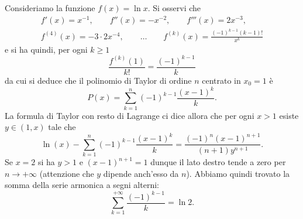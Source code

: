 \begin{example}
Consideriamo la funzione $f(x) = \ln x$.
Si osservi che
\begin{gather*}
  f'(x) = x^{-1},\qquad
  f''(x) = -x^{-2},\qquad
  f'''(x) = 2x^{-3}, \\
  f^{(4)}(x) = -3\cdot 2 x^{-4}, \qquad
  \dots \qquad
  f^{(k)}(x) = \frac{(-1)^{k-1}(k-1)!}{x^k}
\end{gather*}
e si ha quindi, per ogni $k\ge 1$
\[
  \frac{f^{(k)}(1)}{k!} = \frac{(-1)^{k-1}}{k}
\]
da cui si deduce che il polinomio di Taylor di ordine $n$
centrato in $x_0=1$ è
\[
P(x) = \sum_{k=1}^n (-1)^{k-1}\frac{(x-1)^k}{k}.
\]
La formula di Taylor con resto di Lagrange ci dice allora che per
ogni $x>1$ esiste $y\in(1,x)$ tale che
\[
  \ln(x) - \sum_{k=1}^n (-1)^{k-1}\frac{(x-1)^k}{k} = \frac{(-1)^n(x-1)^{n+1}}{(n+1)y^{n+1}}.
\]
Se $x=2$ si ha $y>1$ e $(x-1)^{n+1}=1$ dunque
il lato destro tende a zero per $n\to +\infty$ (attenzione che $y$ dipende anch'esso da $n$). Abbiamo quindi trovato la somma della serie armonica
a segni alterni:
\[
  \sum_{k=1}^{+\infty} \frac{(-1)^{k-1}}{k} = \ln 2.
\]
\end{example}

